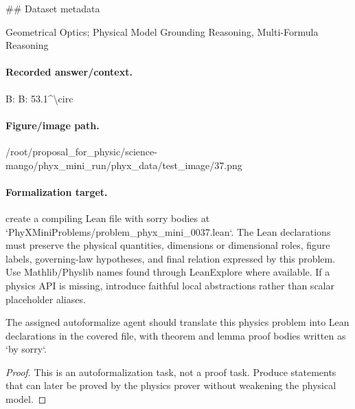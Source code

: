 \#\# Dataset metadata

Geometrical Optics; Physical Model Grounding Reasoning, Multi-Formula Reasoning

\paragraph{Recorded answer/context.}
B: B: 53.1\textasciicircum{}\textbackslash{}circ

\paragraph{Figure/image path.}
/root/proposal\_for\_physic/science-mango/phyx\_mini\_run/phyx\_data/test\_image/37.png

\paragraph{Formalization target.}
create a compiling Lean file with sorry bodies at `PhyXMiniProblems/problem\_phyx\_mini\_0037.lean`. The Lean declarations must preserve the physical quantities, dimensions or dimensional roles, figure labels, governing-law hypotheses, and final relation expressed by this problem.
Use Mathlib/Physlib names found through LeanExplore where available. If a physics API is missing, introduce faithful local abstractions rather than scalar placeholder aliases.

\begin{theorem}
\label{thm:physics:phyx_mini_0037:target}
The assigned autoformalize agent should translate this physics problem into Lean declarations in the covered file, with theorem and lemma proof bodies written as `by sorry`.
\end{theorem}
\begin{proof}
This is an autoformalization task, not a proof task. Produce statements that can later be proved by the physics prover without weakening the physical model.
\end{proof}

